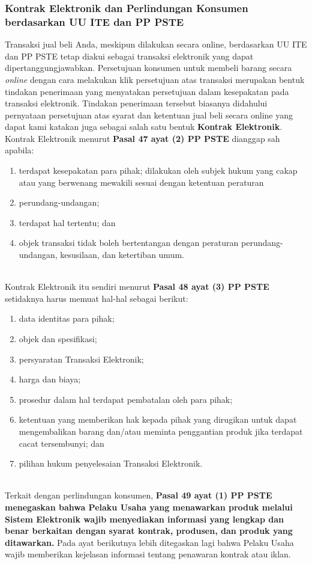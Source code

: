 \subsubsection{Kontrak Elektronik dan Perlindungan Konsumen berdasarkan UU ITE dan PP PSTE}
Transaksi jual beli Anda, meskipun dilakukan secara online, berdasarkan UU ITE dan PP PSTE tetap diakui sebagai transaksi elektronik yang dapat dipertanggungjawabkan. Persetujuan konsumen untuk membeli barang secara \textit{online} dengan cara melakukan klik persetujuan atas transaksi merupakan bentuk tindakan penerimaan yang menyatakan persetujuan dalam kesepakatan pada transaksi elektronik. Tindakan penerimaan tersebut biasanya didahului pernyataan persetujuan atas syarat dan ketentuan jual beli secara online yang dapat kami katakan juga sebagai salah satu bentuk \textbf{Kontrak Elektronik}. Kontrak Elektronik menurut \textbf{Pasal 47 ayat (2) PP PSTE} dianggap sah apabila:
\begin{enumerate}[label=(\alph*).]
	\item terdapat kesepakatan para pihak;
	dilakukan oleh subjek hukum yang cakap atau yang berwenang mewakili sesuai dengan ketentuan peraturan \item perundang-undangan;
	\item terdapat hal tertentu; dan
	\item objek transaksi tidak boleh bertentangan dengan peraturan perundang-undangan, kesusilaan, dan ketertiban umum.
\end{enumerate}
\ \\
\indent Kontrak Elektronik itu sendiri menurut \textbf{Pasal 48 ayat (3) PP PSTE} setidaknya harus memuat hal-hal sebagai berikut:
\begin{enumerate}[label=(\alph*).]
	\item data identitas para pihak;
	\item objek dan spesifikasi;
	\item persyaratan Transaksi Elektronik;
	\item harga dan biaya;
	\item prosedur dalam hal terdapat pembatalan oleh para pihak;
	\item ketentuan yang memberikan hak kepada pihak yang dirugikan untuk dapat mengembalikan barang dan/atau meminta penggantian produk jika terdapat cacat tersembunyi; dan
	\item pilihan hukum penyelesaian Transaksi Elektronik.
\end{enumerate}
\ \\
\indent Terkait dengan perlindungan konsumen, \textbf{Pasal 49 ayat (1) PP PSTE menegaskan bahwa Pelaku Usaha yang menawarkan produk melalui Sistem Elektronik wajib menyediakan informasi yang lengkap dan benar berkaitan dengan syarat kontrak, produsen, dan produk yang ditawarkan.} Pada ayat berikutnya lebih ditegaskan lagi bahwa Pelaku Usaha wajib memberikan kejelasan informasi tentang penawaran kontrak atau iklan.

